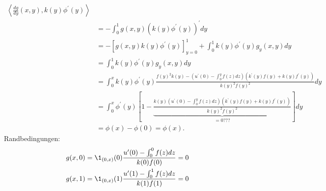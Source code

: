 \begin{solution}
\begin{enumerate}[label = (\roman*)]
\begin{align*}
    \left\langle \frac{dg}{dy}(x,y), k(y)\phi^{\prime}(y) \right\rangle \\
    &= -\int_0^1 g(x,y)(k(y)\phi^{\prime}(y))^{\prime} dy \\
    &= -[g(x,y)k(y)\phi^{\prime}(y)]_{y=0}^1 + \int_0^1k(y)\phi^{\prime}(y)g_y(x,y)dy \\
    &= \int_0^1k(y)\phi^{\prime}(y)g_y(x,y)dy \\
    &= \int_0^xk(y)\phi^{\prime}(y)
    \frac{f(y)^2k(y) - (u^{\prime}(0) - \int_0^yf(z)dz)(k^{\prime}(y)f(y) + k(y)f^{\prime}(y))}
    {k(y)^2f(y)^2}dy \\
    &= \int_0^x\phi^{\prime}(y)\left[1 -
    \underbrace{\frac{k(y)(u^{\prime}(0) - \int_0^yf(z)dz)(k^{\prime}(y)f(y)
    + k(y)f^{\prime}(y))}{k(y)^2f(y)^2}}_{= 0???}\right] dy \\
    &= \phi(x) - \phi(0) = \phi(x).
  \end{align*}
  Randbedingungen:
  \begin{align*}
    g(x,0) &= \1_{(0,x)}(0)\frac{u^{\prime}(0) - \int_0^0 f(z) dz}{k(0)f(0)} = 0 \\
    g(x,1) &= \1_{(0,x)}(1)\frac{u^{\prime}(1) - \int_0^1 f(z) dz}{k(1)f(1)} = 0 \\
  \end{align*}
\end{enumerate}

\end{solution}

